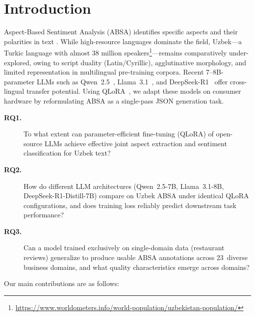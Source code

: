 \documentclass[computers,article,submit,pdftex,moreauthors]{Definitions/mdpi}
\begin{document}

\section{Introduction}
\label{sec:introduction}
Aspect-Based Sentiment Analysis (ABSA) identifies specific aspects and their polarities in text \cite{pontiki-etal-2014-semeval}. While high-resource languages dominate the field, Uzbek---a Turkic language with almost 38 million speakers\footnote{\url{https://www.worldometers.info/world-population/uzbekistan-population/}}---remains comparatively under-explored, owing to script duality (Latin/Cyrillic), agglutinative morphology, and limited representation in multilingual pre-training corpora. Recent 7--8B-parameter LLMs such as Qwen~2.5~\cite{Qwen2024-kr}, Llama~3.1~\cite{Grattafiori2024-ka}, and DeepSeek-R1~\cite{DeepSeek-AI2026-vt} offer cross-lingual transfer potential. Using QLoRA~\cite{10.5555/3666122.3666563}, we adapt these models on consumer hardware by reformulating ABSA as a single-pass JSON generation task.

\begin{description}
\item[\textbf{RQ1.}] To what extent can parameter-efficient fine-tuning (QLoRA) of open-source LLMs achieve effective joint aspect extraction and sentiment classification for Uzbek text?

\item[\textbf{RQ2.}] How do different LLM architectures (Qwen~2.5-7B, Llama~3.1-8B, DeepSeek-R1-Distill-7B) compare on Uzbek ABSA under identical QLoRA configurations, and does training loss reliably predict downstream task performance?

\item[\textbf{RQ3.}] Can a model trained exclusively on single-domain data (restaurant reviews) generalize to produce usable ABSA annotations across 23~diverse business domains, and what quality characteristics emerge across domains?
\end{description}

\noindent Our main contributions are as follows:
\end{document}
